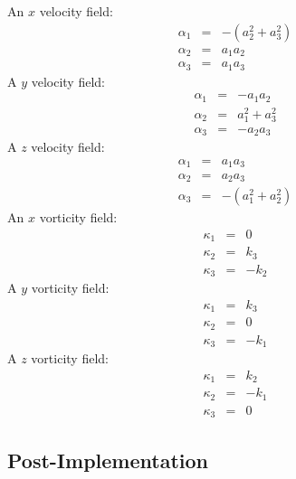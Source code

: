 \documentclass[12pt,onecolumn]{article}
\begin{document}
An $x$ velocity field:
\begin{eqnarray*}
\alpha_1 &=& -(a_2^2 + a_3^2) \\
\alpha_2 &=& a_1 a_2 \\
\alpha_3 &=& a_1 a_3
\end{eqnarray*}
A $y$ velocity field:
\begin{eqnarray*}
\alpha_1 &=& -a_1 a _2 \\
\alpha_2 &=& a_1^2+ a_3^2\\
\alpha_3 &=& -a_2 a_3
\end{eqnarray*}
A $z$ velocity field:
\begin{eqnarray*}
\alpha_1 &=& a_1 a _3 \\
\alpha_2 &=& a_2 a_3\\
\alpha_3 &=& -(a_1^2 + a_2^2)
\end{eqnarray*}
An $x$ vorticity field:
\begin{eqnarray*}
\kappa_1 &=& 0 \\
\kappa_2 &=& k_3\\
\kappa_3 &=& -k_2
\end{eqnarray*}
A $y$ vorticity field:
\begin{eqnarray*}
\kappa_1 &=& k_3 \\
\kappa_2 &=& 0\\
\kappa_3 &=& -k_1
\end{eqnarray*}
A $z$ vorticity field:
\begin{eqnarray*}
\kappa_1 &=& k_2 \\
\kappa_2 &=& -k_1\\
\kappa_3 &=& 0
\end{eqnarray*}

\subsection{Post-Implementation}
\end{document}
